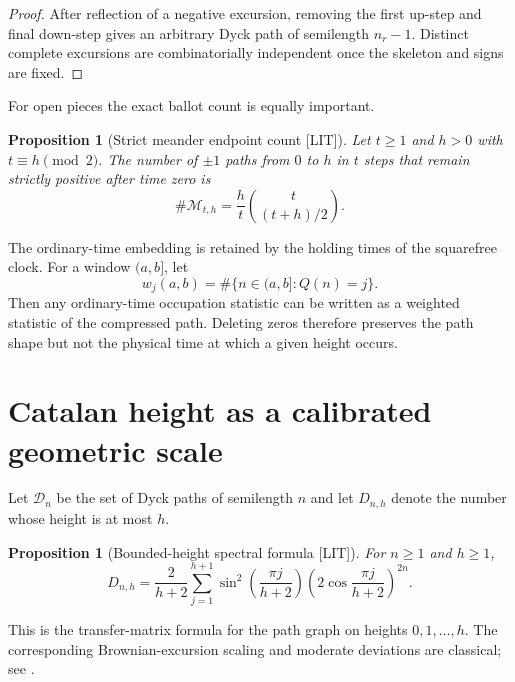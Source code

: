 \documentclass[11pt]{amsart}
\numberwithin{equation}{section}
\theoremstyle{plain}
\newtheorem{proposition}[theorem]{Proposition}
\theoremstyle{definition}
\theoremstyle{remark}
\newcommand{\Sq}{Q}
\newcommand{\LIT}{\textup{[LIT]}}
\begin{document}
\begin{proof}
After reflection of a negative excursion, removing the first up-step and final
down-step gives an arbitrary Dyck path of semilength $n_r-1$.  Distinct complete
excursions are combinatorially independent once the skeleton and signs are fixed.
\end{proof}

For open pieces the exact ballot count is equally important.

\begin{proposition}[Strict meander endpoint count \LIT]
\label{prop:meander-count}
Let $t\ge1$ and $h>0$ with $t\equiv h\pmod 2$.  The number of $\pm1$ paths from $0$
to $h$ in $t$ steps that remain strictly positive after time zero is
\begin{equation}
\#\mathcal M_{t,h}=\frac{h}{t}\binom{t}{(t+h)/2}.
\label{eq:meander-count}
\end{equation}
\end{proposition}

The ordinary-time embedding is retained by the holding times of the squarefree clock.
For a window $(a,b]$, let
\begin{equation}
w_j(a,b)=\#\{n\in(a,b]:\Sq(n)=j\}.
\label{eq:holding-weights}
\end{equation}
Then any ordinary-time occupation statistic can be written as a weighted statistic of
the compressed path.  Deleting zeros therefore preserves the path shape but not the
physical time at which a given height occurs.

\section{Catalan height as a calibrated geometric scale}
\label{sec:catalan-height}

Let $\mathcal D_n$ be the set of Dyck paths of semilength $n$ and let
$D_{n,h}$ denote the number whose height is at most $h$.

\begin{proposition}[Bounded-height spectral formula \LIT]
\label{prop:bounded-height}
For $n\ge1$ and $h\ge1$,
\begin{equation}
D_{n,h}
=
\frac{2}{h+2}
\sum_{j=1}^{h+1}
\sin^2\!\left(\frac{\pi j}{h+2}\right)
\left(2\cos\frac{\pi j}{h+2}\right)^{2n}.
\label{eq:bounded-height-spectral}
\end{equation}
\end{proposition}

This is the transfer-matrix formula for the path graph on heights
$0,1,\ldots,h$.  The corresponding Brownian-excursion scaling and moderate deviations
are classical; see \cite{Kaigh1976,DurrettIglehartMiller1977,KhorunzhiyMarckert2009,Kousha2012}.
\end{document}

